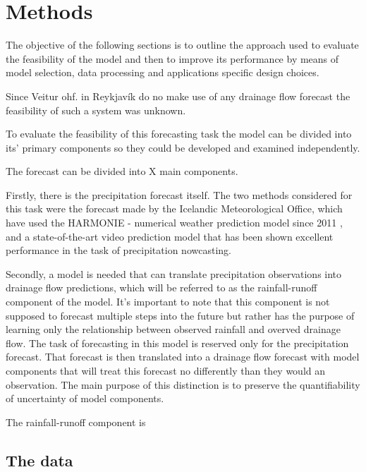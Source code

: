 \chapter{Methods} \label{sec:Methods}
The objective of the following sections is to outline the approach used to evaluate the feasibility of the model and then to improve its performance by means of model selection, data processing and applications specific design choices. 

Since Veitur ohf. in Reykjavík do no make use of any drainage flow forecast the feasibility of such a system was unknown. 

To evaluate the feasibility of this forecasting task the model can be divided into its' primary components so they could be developed and examined independently. 

The forecast can be divided into X main components. 

Firstly, there is the precipitation forecast itself. The two methods considered for this task were the forecast made by the Icelandic Meteorological Office, which have used the HARMONIE - numerical weather prediction model since 2011 \cite{vedurstofaharmonie}, and a state-of-the-art video prediction model that has been shown excellent performance in the task of precipitation nowcasting. 

Secondly, a model is needed that can translate precipitation observations into drainage flow predictions, which will be referred to as the rainfall-runoff component of the model. It's important to note that this component is not supposed to forecast multiple steps into the future but rather has the purpose of learning only the relationship between observed rainfall and overved drainage flow. The task of forecasting in this model is reserved only for the precipitation forecast. That forecast is then translated into a drainage flow forecast with model components that will treat this forecast no differently than they would an observation. The main purpose of this distinction is to preserve the quantifiability of uncertainty of model components. 

The rainfall-runoff component is  




\section{The data}

